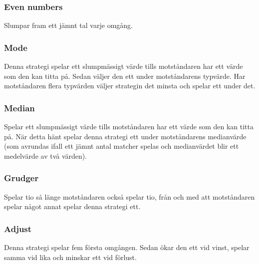 \subsubsection{Even numbers}
Slumpar fram ett jämnt tal varje omgång.

\subsubsection{Mode}
Denna strategi spelar ett slumpmässigt värde tills motståndaren har ett värde som den kan titta på. Sedan väljer den ett under motståndarens typvärde. Har motståndaren flera typvärden väljer strategin det minsta och spelar ett under det.

\subsubsection{Median}
Spelar ett slumpmässigt värde tills motståndaren har ett värde som den kan titta på. När detta hänt spelar denna strategi ett under motståndarens medianvärde (som avrundas ifall ett jämnt antal matcher spelas och medianvärdet blir ett medelvärde av två värden).

\subsubsection{Grudger}
Spelar tio så länge motståndaren också spelar tio, från och med att motståndaren spelar något annat spelar denna strategi ett.

\subsubsection{Adjust}
Denna strategi spelar fem första omgången. Sedan ökar den ett vid vinst, spelar samma vid lika och minskar ett vid förlust.